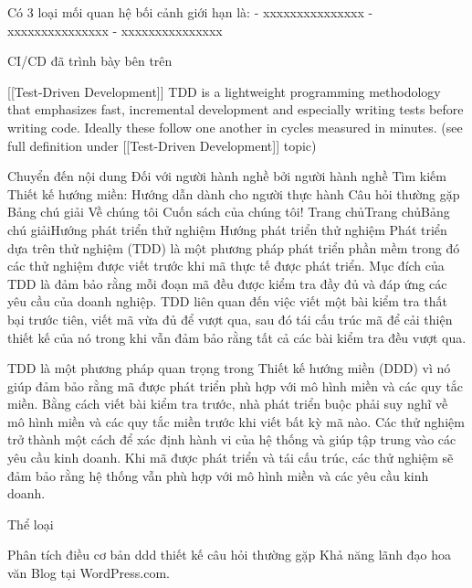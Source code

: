 Có 3 loại mối quan hệ bối cảnh giới hạn là:
- xxxxxxxxxxxxxxx
- xxxxxxxxxxxxxxx
- xxxxxxxxxxxxxxx


CI/CD đã trình bày bên trên

[[Test-Driven Development]] TDD is a lightweight programming methodology that emphasizes fast, incremental development and especially writing tests before writing code. Ideally these follow one another in cycles measured in minutes. (see full definition under [[Test-Driven Development]] topic)


Chuyển đến nội dung
Đối với người hành nghề bởi người hành nghề
Tìm kiếm
Thiết kế hướng miền: Hướng dẫn dành cho người thực hành
Câu hỏi thường gặp
Bảng chú giải
Về chúng tôi
Cuốn sách của chúng tôi!
Trang chủTrang chủBảng chú giảiHướng phát triển thử nghiệm
Hướng phát triển thử nghiệm
Phát triển dựa trên thử nghiệm (TDD) là một phương pháp phát triển phần mềm trong đó các thử nghiệm được viết trước khi mã thực tế được phát triển. Mục đích của TDD là đảm bảo rằng mỗi đoạn mã đều được kiểm tra đầy đủ và đáp ứng các yêu cầu của doanh nghiệp. TDD liên quan đến việc viết một bài kiểm tra thất bại trước tiên, viết mã vừa đủ để vượt qua, sau đó tái cấu trúc mã để cải thiện thiết kế của nó trong khi vẫn đảm bảo rằng tất cả các bài kiểm tra đều vượt qua.

TDD là một phương pháp quan trọng trong Thiết kế hướng miền (DDD) vì nó giúp đảm bảo rằng mã được phát triển phù hợp với mô hình miền và các quy tắc miền. Bằng cách viết bài kiểm tra trước, nhà phát triển buộc phải suy nghĩ về mô hình miền và các quy tắc miền trước khi viết bất kỳ mã nào. Các thử nghiệm trở thành một cách để xác định hành vi của hệ thống và giúp tập trung vào các yêu cầu kinh doanh. Khi mã được phát triển và tái cấu trúc, các thử nghiệm sẽ đảm bảo rằng hệ thống vẫn phù hợp với mô hình miền và các yêu cầu kinh doanh.


Thể loại

Phân tích
điều cơ bản
ddd
thiết kế
câu hỏi thường gặp
Khả năng lãnh đạo
hoa văn
Blog tại WordPress.com.

